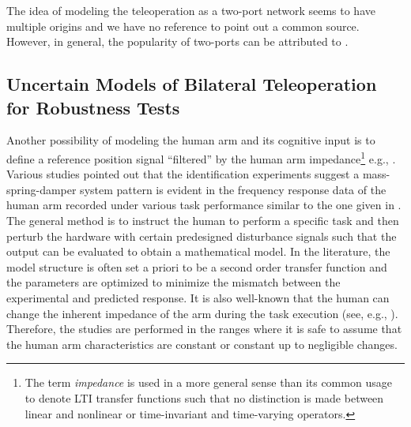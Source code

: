 The idea of modeling the teleoperation as a two-port network seems to have multiple origins and we have no reference to 
point out a common source. However, in general, the popularity of two-ports can be attributed to \cite{andersonspong,nieslotine,
rajuphd,hannaford89,yokokohjiyoshikawa}. 


\subsection{Uncertain Models of Bilateral Teleoperation for Robustness Tests}\label{sec:lit:uncmodel}

Another possibility of modeling the human arm and its cognitive input is to define a reference position signal \enquote{filtered} by the 
human arm impedance\footnote{The term \emph{impedance} is used in a more general sense than its common usage to denote
LTI transfer functions such that no distinction is made between linear and nonlinear or time-invariant and time-varying 
operators.} e.g., \cite{leelee,kazeroonitsay}. Various studies pointed out that the identification experiments suggest a 
mass-spring-damper system pattern is evident in the frequency response data of the human arm recorded under various task 
performance similar to the one given in \cite{hogan89}. The general method is to instruct the human to perform a specific 
task and then perturb the hardware with certain predesigned disturbance signals such that the output can be evaluated to obtain 
a mathematical model. In the literature, the model structure is often set a priori to be a second order transfer function and 
the parameters are optimized to minimize the mismatch between the experimental and predicted response. It is also well-known 
that the human can change the inherent impedance of the arm during the task execution (see, e.g., \cite{tsujimorasso}). 
Therefore, the studies are performed in the ranges where it is safe to assume that the human arm characteristics are constant 
or constant up to negligible changes. 


